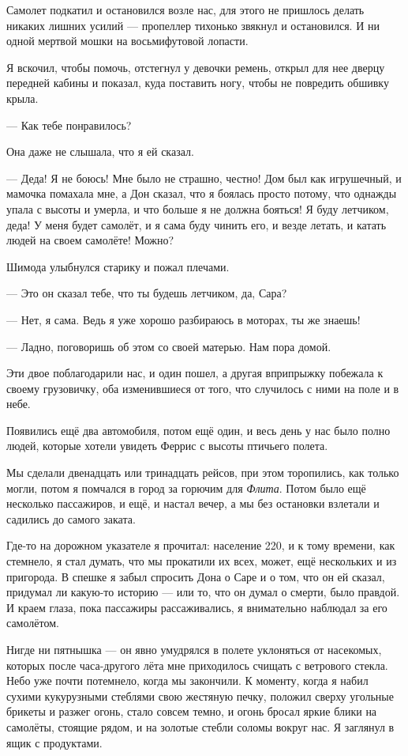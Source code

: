 Самолет подкатил и остановился возле нас, для этого не пришлось делать никаких лишних усилий --- пропеллер тихонько звякнул и остановился. И ни одной мертвой мошки на восьмифутовой лопасти.

Я вскочил, чтобы помочь, отстегнул у девочки ремень, открыл для нее дверцу передней кабины и показал, куда поставить ногу, чтобы не повредить обшивку крыла.

--- Как тебе понравилось?

Она даже не слышала, что я ей сказал.

--- Деда! Я не боюсь! Мне было не страшно, честно! Дом был как игрушечный, и мамочка помахала мне, а Дон сказал, что я боялась просто потому, что однажды упала с высоты и умерла, и что больше я не должна бояться! Я буду летчиком, деда! У меня будет самолёт, и я сама буду чинить его, и везде летать, и катать людей на своем самолёте! Можно?

Шимода улыбнулся старику и пожал плечами.

--- Это он сказал тебе, что ты будешь летчиком, да, Сара?

--- Нет, я сама. Ведь я уже хорошо разбираюсь в моторах, ты же знаешь!

--- Ладно, поговоришь об этом со своей матерью. Нам пора домой.

Эти двое поблагодарили нас, и один пошел, а другая вприпрыжку побежала к своему грузовичку, оба изменившиеся от того, что случилось с ними на поле и в небе.

Появились ещё два автомобиля, потом ещё один, и весь день у нас было полно людей, которые хотели увидеть Феррис с высоты птичьего полета.

Мы сделали двенадцать или тринадцать рейсов, при этом торопились, как только могли, потом я
помчался в город за горючим для {\it Флита}. Потом было ещё несколько пассажиров, и ещё, и настал вечер, а мы без остановки взлетали и садились до самого заката.

Где-то на дорожном указателе я прочитал: население 220, и к тому времени, как стемнело, я стал
думать, что мы прокатили их всех, может, ещё нескольких и из пригорода. В спешке я забыл спросить Дона о Саре и о том, что он ей сказал, придумал ли какую-то историю --- или то, что он думал о смерти, было правдой. И краем глаза, пока пассажиры рассаживались, я внимательно наблюдал за его самолётом.

Нигде ни пятнышка --- он явно умудрялся в полете уклоняться от насекомых, которых после часа-другого лёта мне приходилось счищать с ветрового стекла.
Небо уже почти потемнело, когда мы закончили. К моменту, когда я набил сухими кукурузными стеблями свою жестяную печку, положил сверху угольные брикеты и разжег огонь, стало совсем темно, и огонь бросал яркие блики на самолёты, стоящие рядом, и на золотые стебли соломы вокруг нас. Я заглянул в ящик с продуктами.

